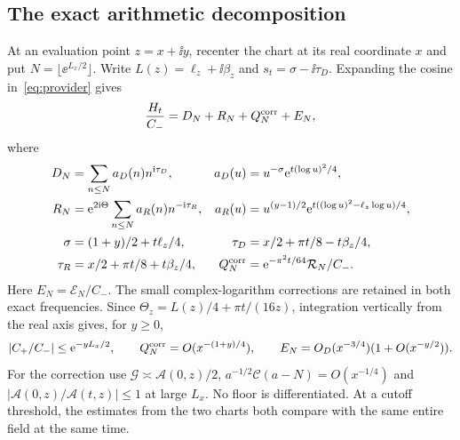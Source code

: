 \subsection{The exact arithmetic decomposition}

At an evaluation point $z=x+\ii y$, recenter the chart at its real
coordinate $x$ and put $N=\lfloor\ee^{L_x/2}\rfloor$.
Write $L(z)=\ell_z+\ii\beta_z$ and $s_t=\sigma-\ii\tau_D$. Expanding
the cosine in~\eqref{eq:provider} gives
\begin{equation}\label{eq:four-terms}
 \frac{H_t}{C_-}=D_N+R_N+Q_N^{\rm corr}+E_N,
\end{equation}
where
\begin{align*}
 D_N&=\sum_{n\le N} a_D(n)n^{\mathrm i\tau_D},&
 a_D(u)&=u^{-\sigma}\mathrm e^{t(\log u)^2/4},\\
 R_N&=\mathrm e^{2\mathrm i\Theta}\sum_{n\le N}a_R(n)n^{-\mathrm i\tau_R},&
 a_R(u)&=u^{(y-1)/2}\mathrm e^{t((\log u)^2-\ell_z\log u)/4},\\
 \sigma&=(1+y)/2+t\ell_z/4,&
 \tau_D&=x/2+\pi t/8-t\beta_z/4,\\
 \tau_R&=x/2+\pi t/8+t\beta_z/4,&
 Q_N^{\rm corr}&=\mathrm e^{-\pi^2t/64}\mathcal R_N/C_-.
\end{align*}
Here $E_N=\mathcal E_N/C_-$. The small complex-logarithm corrections
are retained in both exact frequencies. Since
$\Theta_z=L(z)/4+\pi t/(16z)$, integration vertically from the real
axis gives, for $y\ge0$,
\begin{equation}\label{eq:ratio-correction}
 |C_+/C_-|\le\mathrm e^{-yL_x/2},\qquad
 Q_N^{\rm corr}=O(x^{-(1+y)/4}),\qquad
 E_N=O_D(x^{-3/4})(1+O(x^{-y/2})).
\end{equation}
For the correction use $\mathcal G\asymp\mathcal A(0,z)/2$,
$a^{-1/2}\mathcal C(a-N)=O(x^{-1/4})$ and
$|\mathcal A(0,z)/\mathcal A(t,z)|\le1$ at large $L_x$.
No floor is differentiated. At a cutoff threshold, the estimates from
the two charts both compare with the same entire field at the same time.
